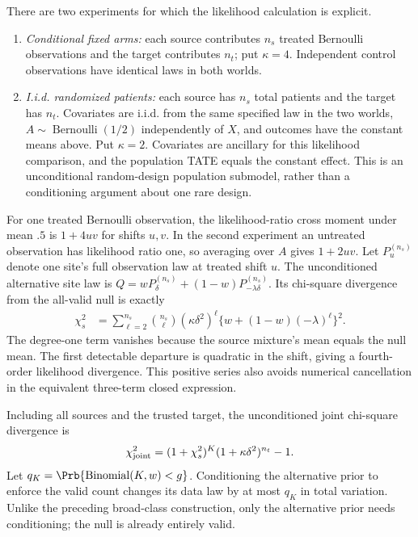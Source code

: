 There are two experiments for which the likelihood calculation is explicit.
\begin{enumerate}
\item \emph{Conditional fixed arms:} each source contributes $n_s$ treated
Bernoulli observations and the target contributes $n_t$; put $\kappa=4$.
Independent control observations have identical laws in both worlds.
\item \emph{I.i.d. randomized patients:} each source has $n_s$ total patients
and the target has $n_t$. Covariates are i.i.d. from the same specified law in
the two worlds, $A\sim\operatorname{Bernoulli}(1/2)$ independently of $X$,
and outcomes have the constant means above. Put $\kappa=2$. Covariates are
ancillary for this likelihood comparison, and the population TATE equals
the constant effect. This is an unconditional random-design population
submodel, rather than a conditioning argument about one rare design.
\end{enumerate}

For one treated Bernoulli observation, the likelihood-ratio cross moment under
mean $.5$ is $1+4uv$ for shifts $u,v$. In the second experiment an untreated
observation has likelihood ratio one, so averaging over $A$ gives $1+2uv$.
Let $P_u^{(n_s)}$ denote one site's full observation law at treated shift $u$.
The unconditioned alternative site law is
$Q=wP_\delta^{(n_s)}+(1-w)P_{-\lambda\delta}^{(n_s)}$. Its chi-square
divergence from the all-valid null is exactly
\begin{align*}
 \chi_s^2
 &=\sum_{\ell=2}^{n_s}\binom{n_s}{\ell}
       (\kappa\delta^2)^\ell
       \{w+(1-w)(-\lambda)^\ell\}^2.\tag{L1}
\end{align*}
The degree-one term vanishes because the source mixture's mean equals the
null mean. The first detectable departure is quadratic in the shift, giving
a fourth-order likelihood divergence. This positive series also avoids
numerical cancellation in the equivalent three-term closed expression.

Including all sources and the trusted target, the unconditioned joint
chi-square divergence is
\[
 \chi_{\rm joint}^2=(1+\chi_s^2)^K
                       (1+\kappa\delta^2)^{n_t}-1.
\]
Let $q_K=\Prb\{\operatorname{Binomial}(K,w)<g\}$. Conditioning the alternative
prior to enforce the valid count changes its data law by at most $q_K$ in
total variation. Unlike the preceding broad-class construction, only the
alternative prior needs conditioning; the null is already entirely valid.

